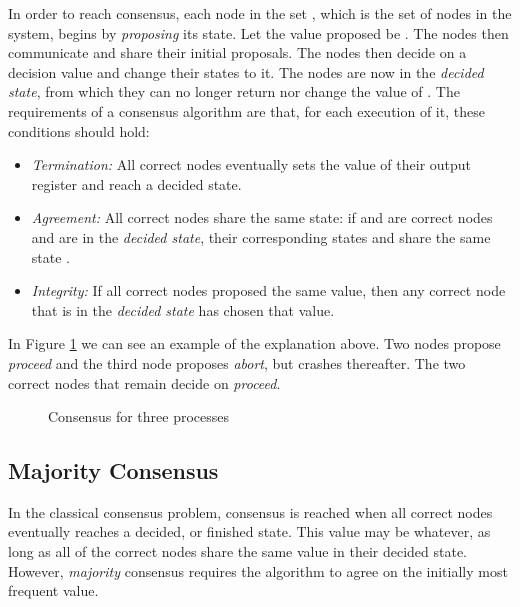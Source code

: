 In order to reach consensus, each node in the set , which is the set of nodes in the system, begins by \emph{proposing} its state. Let the value proposed be . The nodes then communicate and share their initial proposals. The nodes then decide on a decision value  and change their states to it. The nodes are now in the \emph{decided state}, from which they can no longer return nor change the value of . The requirements of a consensus algorithm are that, for each execution of it, these conditions should hold:

\begin{itemize}[label={}]
  \item \emph{Termination:} All correct nodes eventually sets the value of their output register and reach a decided state.
  \item \emph{Agreement:} All correct nodes share the same state: if  and  are correct nodes and are in the \emph{decided state}, their corresponding states  and  share the same state .
  \item \emph{Integrity:} If all correct nodes proposed the same value, then any correct node that is in the \emph{decided state} has chosen that value.
\end{itemize}


In Figure \ref{fig:ConsensusProblem} we can see an example of the explanation above. Two nodes propose \emph{proceed} and the third node proposes \emph{abort}, but crashes thereafter. The two correct nodes that remain decide on \emph{proceed}.
\begin{figure}[H]
    \centering
    
    \caption{Consensus for three processes}
    \label{fig:ConsensusProblem}
\end{figure}



\subsection{Majority Consensus}

In the classical consensus problem, consensus is reached when all correct nodes eventually reaches a decided, or finished state. This value may be whatever, as long as all of the correct nodes share the same value in their decided state. However, \emph{majority} consensus requires the algorithm to agree on the initially most frequent value.

